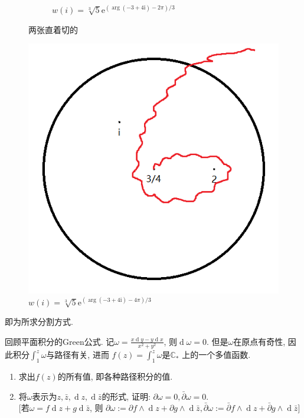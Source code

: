 \documentclass[a4paper,12pt]{ctexart}
\DeclareMathOperator{\diff}{d}
\newcommand{\me}{\mathrm{e}}
\newcommand{\mi}{\mathrm{i}}
\begin{document}
\begin{solution}
\begin{figure}[H]
\begin{subfigure}{.49\textwidth}
                \caption{$\displaystyle w(i)=
                    \sqrt[3]{5}\me^{(\arg(-3+4\mi)-2\pi)/3}$}
                \label{figure_-2pi}
            \end{subfigure}
            \caption{两张直着切的}
            \label{figure_straight}
        \end{figure}
        \begin{figure}[H]
            \centering
            \includegraphics[scale=0.5]{-4pi.png}
            \caption{$\displaystyle w(i)=\sqrt[3]{5}
                \me^{(\arg(-3+4\mi)-4\pi)/3}$}
            \label{figure_-4pi}
        \end{figure}
        即为所求分割方式.
    \end{solution}

    \begin{problem}
        回顾平面积分的Green公式.
        记$\displaystyle\omega=\frac{x\diff y-y\diff x}{x^2+y^2}$,
        则$\diff \omega=0$.
        但是$\omega$在原点有奇性,
        因此积分$\displaystyle\int_{1}^{z}{\omega}$与路径有关, 进而
        $\displaystyle f(z)=\int_{1}^{z}{\omega}$是$\mathbb{C}_{*}$
        上的一个多值函数.
        \begin{enumerate}[(1)]
            \item 求出$f(z)$的所有值, 即各种路径积分的值.
            \item 将$\omega$表示为$z, \bar{z}, \diff z, \diff \bar{z}$的形式,
                证明: $\partial\omega=0, \bar{\partial}\omega=0$.\\
                {[}若$\omega=f\diff z+g\diff \bar{z}$, 则
                $\partial\omega:=\partial f\wedge\diff z
                    +\partial g\wedge\diff \bar{z},
                \bar{\partial}\omega:=\bar{\partial} f\wedge\diff z
                    +\bar{\partial} g\wedge\diff \bar{z}${]}
        \end{enumerate}
    \end{problem}
\end{document}
